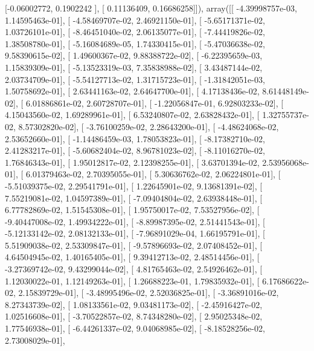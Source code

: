 \documentclass{article}
\begin{document}
       [-0.06002772,  0.1902242 ],
       [ 0.11136409,  0.16686258]]), array([[ -4.39998757e-03,   1.14595463e-01],
       [ -4.58469707e-02,   2.46921150e-01],
       [ -5.65171371e-02,   1.03726101e-01],
       [ -8.46451040e-02,   2.06135077e-01],
       [ -7.44419826e-02,   1.38508780e-01],
       [ -5.16084689e-05,   1.74330415e-01],
       [ -5.47036638e-02,   9.58390615e-02],
       [  1.49600367e-02,   9.88388722e-02],
       [ -6.22395659e-03,   1.15839309e-01],
       [ -5.13523319e-03,   7.35838988e-02],
       [  3.43487144e-02,   2.03734709e-01],
       [ -5.54127713e-02,   1.31715723e-01],
       [ -1.31842051e-03,   1.50758692e-01],
       [  2.63441163e-02,   2.64647700e-01],
       [  4.17138436e-02,   8.61448149e-02],
       [  6.01886861e-02,   2.60728707e-01],
       [ -1.22056847e-01,   6.92803233e-02],
       [  4.15043560e-02,   1.69289961e-01],
       [  6.53240807e-02,   2.63828432e-01],
       [  1.32755737e-02,   8.57302820e-02],
       [ -3.76100259e-02,   2.28643200e-01],
       [ -4.48624068e-02,   2.53652660e-01],
       [ -1.14486459e-03,   1.78053823e-01],
       [ -8.17382710e-02,   2.41283217e-01],
       [ -5.60682404e-02,   8.96781023e-02],
       [ -8.11016270e-02,   1.76846343e-01],
       [  1.95012817e-02,   2.12398255e-01],
       [  3.63701394e-02,   2.53956068e-01],
       [  6.01379463e-02,   2.70395055e-01],
       [  5.30636762e-02,   2.06224801e-01],
       [ -5.51039375e-02,   2.29541791e-01],
       [  1.22645901e-02,   9.13681391e-02],
       [  7.55219081e-02,   1.04597389e-01],
       [ -7.09404804e-02,   2.63938448e-01],
       [  6.77782869e-02,   1.51545308e-01],
       [  1.95750017e-02,   7.53527956e-02],
       [ -9.40447008e-02,   1.49934222e-01],
       [ -8.89987395e-02,   2.51441543e-01],
       [ -5.12133142e-02,   2.08132133e-01],
       [ -7.96891029e-04,   1.66195791e-01],
       [  5.51909038e-02,   2.53309847e-01],
       [ -9.57896693e-02,   2.07408452e-01],
       [  4.64504945e-02,   1.40165405e-01],
       [  9.39412713e-02,   2.48514456e-01],
       [ -3.27369742e-02,   9.43299044e-02],
       [  4.81765463e-02,   2.54926462e-01],
       [  1.12030022e-01,   1.12149263e-01],
       [  1.26688223e-01,   1.79835932e-01],
       [  6.17686622e-02,   2.15839729e-01],
       [ -3.48995496e-02,   2.52036825e-01],
       [ -3.36891016e-02,   8.27343739e-02],
       [  1.08133561e-02,   9.03481173e-02],
       [ -2.45916427e-02,   1.02516608e-01],
       [ -3.70522857e-02,   8.74348280e-02],
       [  2.95025348e-02,   1.77546938e-01],
       [ -6.44261337e-02,   9.04068985e-02],
       [ -8.18528256e-02,   2.73008029e-01],
\end{document}
